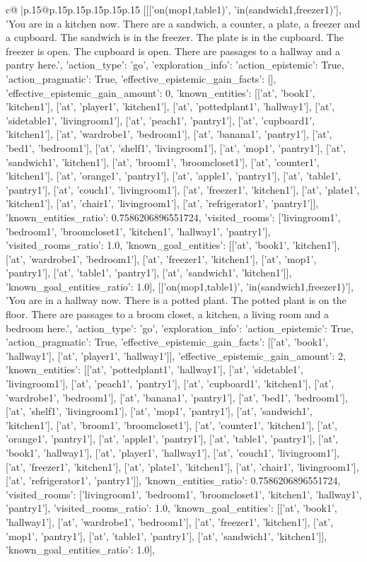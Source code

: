 \documentclass{article}
\begin{document}
{\begin{supertabular}{c@{$\;$}|p{.15\linewidth}@{}p{.15\linewidth}p{.15\linewidth}p{.15\linewidth}p{.15\linewidth}p{.15\linewidth}}
{{{	 [[['on(mop1,table1)', 'in(sandwich1,freezer1)'], 'You are in a kitchen now. There are a sandwich, a counter, a plate, a freezer and a cupboard. The sandwich is in the freezer. The plate is in the cupboard. The freezer is open. The cupboard is open. There are passages to a hallway and a pantry here.', {'action_type': 'go', 'exploration_info': {'action_epistemic': True, 'action_pragmatic': True, 'effective_epistemic_gain_facts': [], 'effective_epistemic_gain_amount': 0, 'known_entities': [['at', 'book1', 'kitchen1'], ['at', 'player1', 'kitchen1'], ['at', 'pottedplant1', 'hallway1'], ['at', 'sidetable1', 'livingroom1'], ['at', 'peach1', 'pantry1'], ['at', 'cupboard1', 'kitchen1'], ['at', 'wardrobe1', 'bedroom1'], ['at', 'banana1', 'pantry1'], ['at', 'bed1', 'bedroom1'], ['at', 'shelf1', 'livingroom1'], ['at', 'mop1', 'pantry1'], ['at', 'sandwich1', 'kitchen1'], ['at', 'broom1', 'broomcloset1'], ['at', 'counter1', 'kitchen1'], ['at', 'orange1', 'pantry1'], ['at', 'apple1', 'pantry1'], ['at', 'table1', 'pantry1'], ['at', 'couch1', 'livingroom1'], ['at', 'freezer1', 'kitchen1'], ['at', 'plate1', 'kitchen1'], ['at', 'chair1', 'livingroom1'], ['at', 'refrigerator1', 'pantry1']], 'known_entities_ratio': 0.7586206896551724, 'visited_rooms': ['livingroom1', 'bedroom1', 'broomcloset1', 'kitchen1', 'hallway1', 'pantry1'], 'visited_rooms_ratio': 1.0, 'known_goal_entities': [['at', 'book1', 'kitchen1'], ['at', 'wardrobe1', 'bedroom1'], ['at', 'freezer1', 'kitchen1'], ['at', 'mop1', 'pantry1'], ['at', 'table1', 'pantry1'], ['at', 'sandwich1', 'kitchen1']], 'known_goal_entities_ratio': 1.0}}], [['on(mop1,table1)', 'in(sandwich1,freezer1)'], 'You are in a hallway now. There is a potted plant. The potted plant is on the floor. There are passages to a broom closet, a kitchen, a living room and a bedroom here.', {'action_type': 'go', 'exploration_info': {'action_epistemic': True, 'action_pragmatic': True, 'effective_epistemic_gain_facts': [['at', 'book1', 'hallway1'], ['at', 'player1', 'hallway1']], 'effective_epistemic_gain_amount': 2, 'known_entities': [['at', 'pottedplant1', 'hallway1'], ['at', 'sidetable1', 'livingroom1'], ['at', 'peach1', 'pantry1'], ['at', 'cupboard1', 'kitchen1'], ['at', 'wardrobe1', 'bedroom1'], ['at', 'banana1', 'pantry1'], ['at', 'bed1', 'bedroom1'], ['at', 'shelf1', 'livingroom1'], ['at', 'mop1', 'pantry1'], ['at', 'sandwich1', 'kitchen1'], ['at', 'broom1', 'broomcloset1'], ['at', 'counter1', 'kitchen1'], ['at', 'orange1', 'pantry1'], ['at', 'apple1', 'pantry1'], ['at', 'table1', 'pantry1'], ['at', 'book1', 'hallway1'], ['at', 'player1', 'hallway1'], ['at', 'couch1', 'livingroom1'], ['at', 'freezer1', 'kitchen1'], ['at', 'plate1', 'kitchen1'], ['at', 'chair1', 'livingroom1'], ['at', 'refrigerator1', 'pantry1']], 'known_entities_ratio': 0.7586206896551724, 'visited_rooms': ['livingroom1', 'bedroom1', 'broomcloset1', 'kitchen1', 'hallway1', 'pantry1'], 'visited_rooms_ratio': 1.0, 'known_goal_entities': [['at', 'book1', 'hallway1'], ['at', 'wardrobe1', 'bedroom1'], ['at', 'freezer1', 'kitchen1'], ['at', 'mop1', 'pantry1'], ['at', 'table1', 'pantry1'], ['at', 'sandwich1', 'kitchen1']], 'known_goal_entities_ratio': 1.0}}], }}}
\end{supertabular}}
\end{document}
